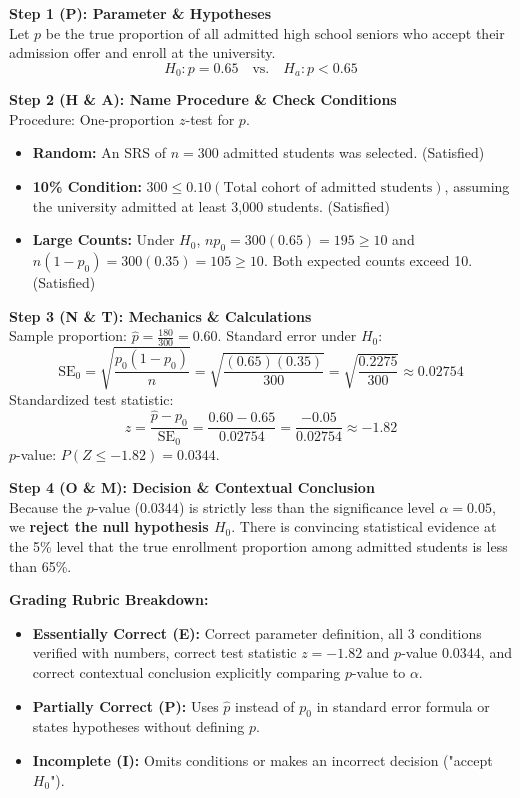 \begin{frqrubricbox}
\textbf{Step 1 (P): Parameter \& Hypotheses}\\
Let $p$ be the true proportion of all admitted high school seniors who accept their admission offer and enroll at the university.
\[ H_0: p = 0.65 \quad \text{vs.} \quad H_a: p < 0.65 \]

\textbf{Step 2 (H \& A): Name Procedure \& Check Conditions}\\
Procedure: One-proportion $z$-test for $p$.
\begin{itemize}
  \item \textbf{Random:} An SRS of $n = 300$ admitted students was selected. (Satisfied)
  \item \textbf{10\% Condition:} $300 \le 0.10(\text{Total cohort of admitted students})$, assuming the university admitted at least 3,000 students. (Satisfied)
  \item \textbf{Large Counts:} Under $H_0$, $n p_0 = 300(0.65) = 195 \ge 10$ and $n(1 - p_0) = 300(0.35) = 105 \ge 10$. Both expected counts exceed 10. (Satisfied)
\end{itemize}

\textbf{Step 3 (N \& T): Mechanics \& Calculations}\\
Sample proportion: $\hat{p} = \frac{180}{300} = 0.60$.
Standard error under $H_0$:
\[ \text{SE}_0 = \sqrt{\frac{p_0(1 - p_0)}{n}} = \sqrt{\frac{(0.65)(0.35)}{300}} = \sqrt{\frac{0.2275}{300}} \approx 0.02754 \]
Standardized test statistic:
\[ z = \frac{\hat{p} - p_0}{\text{SE}_0} = \frac{0.60 - 0.65}{0.02754} = \frac{-0.05}{0.02754} \approx -1.82 \]
$p$-value: $P(Z \le -1.82) = 0.0344$.

\textbf{Step 4 (O \& M): Decision \& Contextual Conclusion}\\
Because the $p$-value ($0.0344$) is strictly less than the significance level $\alpha = 0.05$, we \textbf{reject the null hypothesis $H_0$}. There is convincing statistical evidence at the 5\% level that the true enrollment proportion among admitted students is less than 65\%.

\textbf{Grading Rubric Breakdown:}\\
\begin{itemize}
  \item \textbf{Essentially Correct (E):} Correct parameter definition, all 3 conditions verified with numbers, correct test statistic $z = -1.82$ and $p$-value $0.0344$, and correct contextual conclusion explicitly comparing $p$-value to $\alpha$.
  \item \textbf{Partially Correct (P):} Uses $\hat{p}$ instead of $p_0$ in standard error formula or states hypotheses without defining $p$.
  \item \textbf{Incomplete (I):} Omits conditions or makes an incorrect decision ("accept $H_0$").
\end{itemize}
\end{frqrubricbox}

